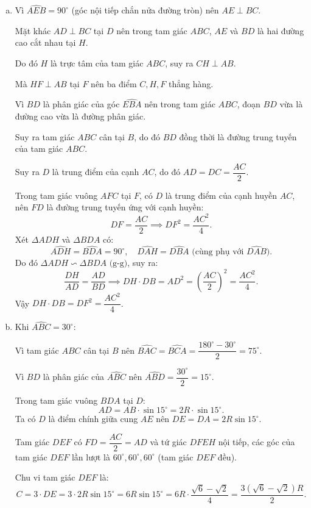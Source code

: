 \begin{bt}
{\begin{enumerate}[a)]
			Do đó $AD \perp BD \implies \widehat{HDA} = 90^\circ$.
			
			Vì $HF \perp AB$ tại $F$ nên $\widehat{HFA} = 90^\circ$.
			
			Tứ giác $AFHD$ có $\widehat{HDA} = \widehat{HFA} = 90^\circ$, do đó hai đỉnh kề nhau $D$ và $F$ cùng nhìn đoạn $AH$ dưới một góc vuông.
			
			Suy ra tứ giác $AFHD$ nội tiếp đường tròn đường kính $AH$.
			
			Do đó $\widehat{HFD} = \widehat{HAD}$ (hai góc nội tiếp cùng chắn cung $HD$).
			\item Vì $\widehat{AEB} = 90^\circ$ (góc nội tiếp chắn nửa đường tròn) nên $AE \perp BC$.
			
			Mặt khác $AD \perp BC$ tại $D$ nên trong tam giác $ABC$, $AE$ và $BD$ là hai đường cao cắt nhau tại $H$.
			
			Do đó $H$ là trực tâm của tam giác $ABC$, suy ra $CH \perp AB$.
			
			Mà $HF \perp AB$ tại $F$ nên ba điểm $C, H, F$ thẳng hàng.
			
			Vì $BD$ là phân giác của góc $\widehat{EBA}$ nên trong tam giác $ABC$, đoạn $BD$ vừa là đường cao vừa là đường phân giác.
			
			Suy ra tam giác $ABC$ cân tại $B$, do đó $BD$ đồng thời là đường trung tuyến của tam giác $ABC$.
			
			Suy ra $D$ là trung điểm của cạnh $AC$, do đó $AD = DC = \dfrac{AC}{2}$.
			
			Trong tam giác vuông $AFC$ tại $F$, có $D$ là trung điểm của cạnh huyền $AC$, nên $FD$ là đường trung tuyến ứng với cạnh huyền:
			$$DF = \dfrac{AC}{2} \implies DF^2 = \dfrac{AC^2}{4}.$$
			Xét $\Delta ADH$ và $\Delta BDA$ có:
			$$\widehat{ADH} = \widehat{BDA} = 90^\circ,\quad \widehat{DAH} = \widehat{DBA}\text{ (cùng phụ với }\widehat{DAB}).$$
			Do đó $\Delta ADH \backsim \Delta BDA\text{ (g-g)}$, suy ra:
			$$\dfrac{DH}{AD} = \dfrac{AD}{BD} \implies DH \cdot DB = AD^2 = \left(\dfrac{AC}{2}\right)^2 = \dfrac{AC^2}{4}.$$
			Vậy $DH \cdot DB = DF^2 = \dfrac{AC^2}{4}$.
			\item Khi $\widehat{ABC} = 30^\circ$:
			
			Vì tam giác $ABC$ cân tại $B$ nên $\widehat{BAC} = \widehat{BCA} = \dfrac{180^\circ - 30^\circ}{2} = 75^\circ$.
			
			Vì $BD$ là phân giác của $\widehat{ABC}$ nên $\widehat{ABD} = \dfrac{30^\circ}{2} = 15^\circ$.
			
			Trong tam giác vuông $BDA$ tại $D$:
			$$AD = AB \cdot \sin 15^\circ = 2R \cdot \sin 15^\circ.$$
			Ta có $D$ là điểm chính giữa cung $AE$ nên $DE = DA = 2R\sin 15^\circ$.
			
			Tam giác $DEF$ có $FD = \dfrac{AC}{2} = AD$ và tứ giác $DFEH$ nội tiếp, các góc của tam giác $DEF$ lần lượt là $60^\circ, 60^\circ, 60^\circ$ (tam giác $DEF$ đều).
			
			Chu vi tam giác $DEF$ là:
			$$C = 3 \cdot DE = 3 \cdot 2R\sin 15^\circ = 6R\sin 15^\circ = 6R \cdot \dfrac{\sqrt{6} - \sqrt{2}}{4} = \dfrac{3(\sqrt{6} - \sqrt{2})R}{2}.$$
		\end{enumerate}
}
\end{bt}


